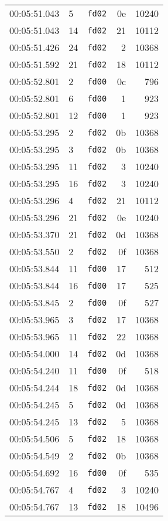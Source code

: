 \documentclass{article}
\begin{document}
\begin{longtable}{lllrr}
00:05:51.043 & 5 & \texttt{fd02} & 0e & 10240 \\
00:05:51.043 & 14 & \texttt{fd02} & 21 & 10112 \\
00:05:51.426 & 24 & \texttt{fd02} & 2 & 10368 \\
00:05:51.592 & 21 & \texttt{fd02} & 18 & 10112 \\
00:05:52.801 & 2 & \texttt{fd00} & 0c & 796 \\
00:05:52.801 & 6 & \texttt{fd00} & 1 & 923 \\
00:05:52.801 & 12 & \texttt{fd00} & 1 & 923 \\
00:05:53.295 & 2 & \texttt{fd02} & 0b & 10368 \\
00:05:53.295 & 3 & \texttt{fd02} & 0b & 10368 \\
00:05:53.295 & 11 & \texttt{fd02} & 3 & 10240 \\
00:05:53.295 & 16 & \texttt{fd02} & 3 & 10240 \\
00:05:53.296 & 4 & \texttt{fd02} & 21 & 10112 \\
00:05:53.296 & 21 & \texttt{fd02} & 0e & 10240 \\
00:05:53.370 & 21 & \texttt{fd02} & 0d & 10368 \\
00:05:53.550 & 2 & \texttt{fd02} & 0f & 10368 \\
00:05:53.844 & 11 & \texttt{fd00} & 17 & 512 \\
00:05:53.844 & 16 & \texttt{fd00} & 17 & 525 \\
00:05:53.845 & 2 & \texttt{fd00} & 0f & 527 \\
00:05:53.965 & 3 & \texttt{fd02} & 17 & 10368 \\
00:05:53.965 & 11 & \texttt{fd02} & 22 & 10368 \\
00:05:54.000 & 14 & \texttt{fd02} & 0d & 10368 \\
00:05:54.240 & 11 & \texttt{fd00} & 0f & 518 \\
00:05:54.244 & 18 & \texttt{fd02} & 0d & 10368 \\
00:05:54.245 & 5 & \texttt{fd02} & 0d & 10368 \\
00:05:54.245 & 13 & \texttt{fd02} & 5 & 10368 \\
00:05:54.506 & 5 & \texttt{fd02} & 18 & 10368 \\
00:05:54.549 & 2 & \texttt{fd02} & 0b & 10368 \\
00:05:54.692 & 16 & \texttt{fd00} & 0f & 535 \\
00:05:54.767 & 4 & \texttt{fd02} & 3 & 10240 \\
00:05:54.767 & 13 & \texttt{fd02} & 18 & 10496 \\

\end{longtable}
\end{document}
